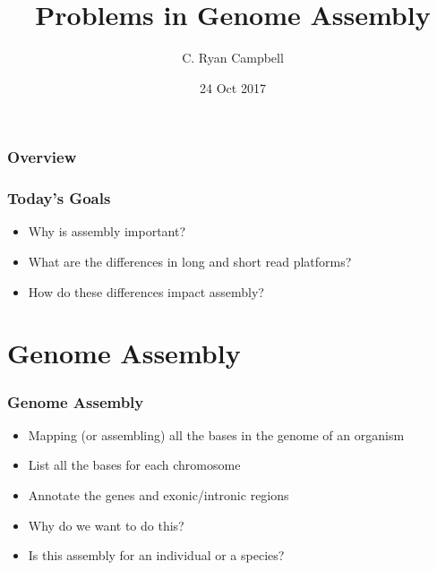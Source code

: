 \documentclass[14pt,handout]{beamer}
\title[Genome Assembly]{Problems in Genome Assembly} %
\author{C. Ryan Campbell} %
\institute[Duke] %
{
Duke University \\ %
\medskip
\textit{c.ryan.campbell@duke.edu} %
}
\date{24 Oct 2017} %
\begin{document}
\begin{frame}
\titlepage %
\end{frame}

\begin{frame}
\frametitle{Overview} %
\tableofcontents %
\end{frame}


\begin{frame}
\frametitle{Today's Goals}
\begin{itemize}
	\item<+-> Why is assembly important?
	\item<+-> What are the differences in long and short read platforms?
	\item<+-> How do these differences impact assembly?
\end{itemize}
\end{frame}

\section{Genome Assembly}

\begin{frame}
\frametitle{Genome Assembly}
\begin{itemize}
	\item<+-> Mapping (or assembling) all the bases in the genome of an organism
	\item<+-> List all the bases for each chromosome
	\item<+-> Annotate the genes and exonic/intronic regions
	\item<+-> Why do we want to do this?
	\item<+-> Is this assembly for an individual or a species?
\end{itemize}
\end{frame}
\end{document}
